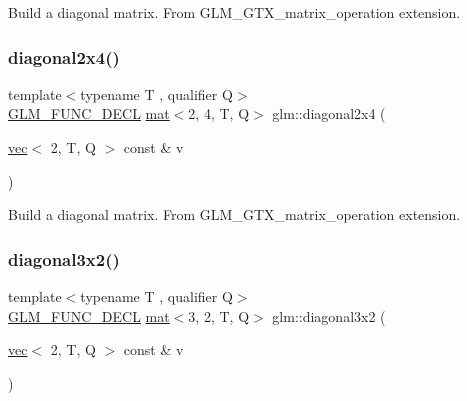 Build a diagonal matrix. From G\+L\+M\+\_\+\+G\+T\+X\+\_\+matrix\+\_\+operation extension. \mbox{\label{group__gtx__matrix__operation_ga30b4dbfed60a919d66acc8a63bcdc549}} 
\subsubsection{\texorpdfstring{diagonal2x4()}{diagonal2x4()}}
{\footnotesize\ttfamily template$<$typename T , qualifier Q$>$ \\
\hyperlink{setup_8hpp_ab2d052de21a70539923e9bcbf6e83a51}{G\+L\+M\+\_\+\+F\+U\+N\+C\+\_\+\+D\+E\+CL} \hyperlink{structglm_1_1mat}{mat}$<$2, 4, T, Q$>$ glm\+::diagonal2x4 (\begin{DoxyParamCaption}\item[{\hyperlink{structglm_1_1vec}{vec}$<$ 2, T, Q $>$ const \&}]{v }\end{DoxyParamCaption})}

Build a diagonal matrix. From G\+L\+M\+\_\+\+G\+T\+X\+\_\+matrix\+\_\+operation extension. \mbox{\label{group__gtx__matrix__operation_ga832c805d5130d28ad76236958d15b47d}} 
\subsubsection{\texorpdfstring{diagonal3x2()}{diagonal3x2()}}
{\footnotesize\ttfamily template$<$typename T , qualifier Q$>$ \\
\hyperlink{setup_8hpp_ab2d052de21a70539923e9bcbf6e83a51}{G\+L\+M\+\_\+\+F\+U\+N\+C\+\_\+\+D\+E\+CL} \hyperlink{structglm_1_1mat}{mat}$<$3, 2, T, Q$>$ glm\+::diagonal3x2 (\begin{DoxyParamCaption}\item[{\hyperlink{structglm_1_1vec}{vec}$<$ 2, T, Q $>$ const \&}]{v }\end{DoxyParamCaption})}

